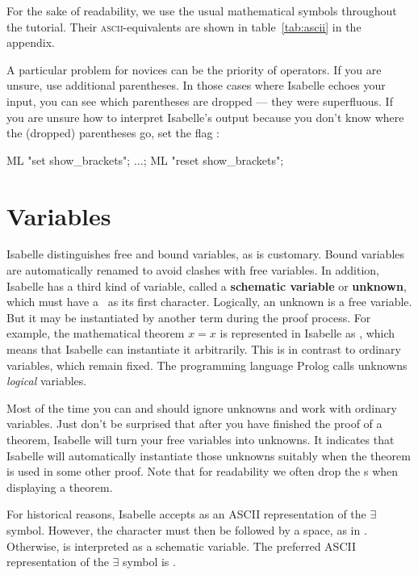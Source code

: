 For the sake of readability, we use the usual mathematical symbols throughout
the tutorial. Their \textsc{ascii}-equivalents are shown in table~\ref{tab:ascii} in
the appendix.

\begin{warn}
A particular
problem for novices can be the priority of operators. If you are unsure, use
additional parentheses. In those cases where Isabelle echoes your
input, you can see which parentheses are dropped --- they were superfluous. If
you are unsure how to interpret Isabelle's output because you don't know
where the (dropped) parentheses go, set the flag
:
\begin{ttbox}
ML "set show_brackets"; \(\dots\); ML "reset show_brackets";
\end{ttbox}
\end{warn}


\section{Variables}
\label{sec:variables}

Isabelle distinguishes free and bound variables, as is customary. Bound
variables are automatically renamed to avoid clashes with free variables. In
addition, Isabelle has a third kind of variable, called a \textbf{schematic
  variable} or \textbf{unknown}, 
which must have a~ as its first character.  
Logically, an unknown is a free variable. But it may be
instantiated by another term during the proof process. For example, the
mathematical theorem $x = x$ is represented in Isabelle as ,
which means that Isabelle can instantiate it arbitrarily. This is in contrast
to ordinary variables, which remain fixed. The programming language Prolog
calls unknowns {\em logical\/} variables.

Most of the time you can and should ignore unknowns and work with ordinary
variables. Just don't be surprised that after you have finished the proof of
a theorem, Isabelle will turn your free variables into unknowns.  It
indicates that Isabelle will automatically instantiate those unknowns
suitably when the theorem is used in some other proof.
Note that for readability we often drop the s when displaying a theorem.
\begin{warn}
  For historical reasons, Isabelle accepts  as an ASCII representation
  of the \(\exists\) symbol.  However, the  character must then be followed
  by a space, as in .  Otherwise,  is
  interpreted as a schematic variable.  The preferred ASCII representation of
  the \(\exists\) symbol is \@. 
\end{warn}%

